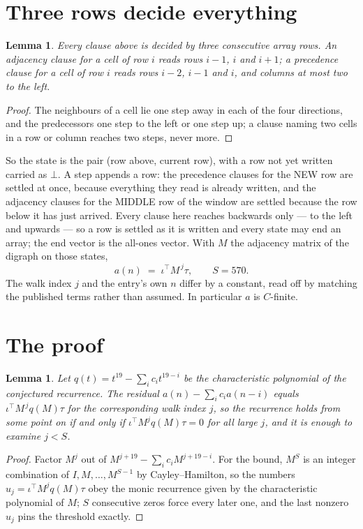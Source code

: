 \documentclass[11pt,a4paper]{article}
\theoremstyle{plain}
\newtheorem{lemma}[theorem]{Lemma}
\theoremstyle{definition}
\begin{document}
\section{Three rows decide everything}

\begin{lemma}\label{lem:win}
Every clause above is decided by three consecutive array rows. An adjacency clause for a cell
of row $i$ reads rows $i-1$, $i$ and $i+1$; a precedence clause for a cell of row $i$ reads
rows $i-2$, $i-1$ and $i$, and columns at most two to the left.
\end{lemma}

\begin{proof}
The neighbours of a cell lie one step away in each of the four directions, and the predecessors
one step to the left or one step up; a clause naming two cells in a row or column reaches two
steps, never more.
\end{proof}

So the state is the pair (row above, current row), with a row not yet written carried as
$\bot$. A step appends a row: the precedence clauses for the NEW row are settled at once,
because everything they read is already written, and the adjacency clauses for the MIDDLE row
of the window are settled because the row below it has just arrived. Every clause here reaches backwards only --- to the left and upwards --- so a
row is settled as it is written and every state may end an array; the end vector is the
all-ones vector. With $M$ the
adjacency matrix of the digraph on those states,
\[
a(n)\;=\;\iota^{\!\top}M^{\,j}\tau ,\qquad S=570.
\]
The walk index $j$ and the entry's own $n$ differ by a constant, read off by matching the
published terms rather than assumed. In particular $a$ is $C$-finite.

\section{The proof}

\begin{lemma}\label{lem:crit}
Let $q(t)=t^{19}-\sum_i c_it^{19-i}$ be the characteristic polynomial of the
conjectured recurrence. The residual $a(n)-\sum_ic_ia(n-i)$ equals
$\iota^{\!\top}M^{\,j}q(M)\tau$ for the corresponding walk index $j$, so the recurrence
holds from some point on if and only if $\iota^{\!\top}M^{j}q(M)\tau=0$ for all large $j$,
and it is enough to examine $j<S$.
\end{lemma}

\begin{proof}
Factor $M^{j}$ out of $M^{j+19}-\sum_ic_iM^{j+19-i}$. For the bound, $M^{S}$
is an integer combination of $I,M,\dots,M^{S-1}$ by Cayley--Hamilton, so the numbers
$u_j=\iota^{\!\top}M^{j}q(M)\tau$ obey the monic recurrence given by the characteristic
polynomial of $M$; $S$ consecutive zeros force every later one, and the last nonzero $u_j$
pins the threshold exactly.
\end{proof}
\end{document}
